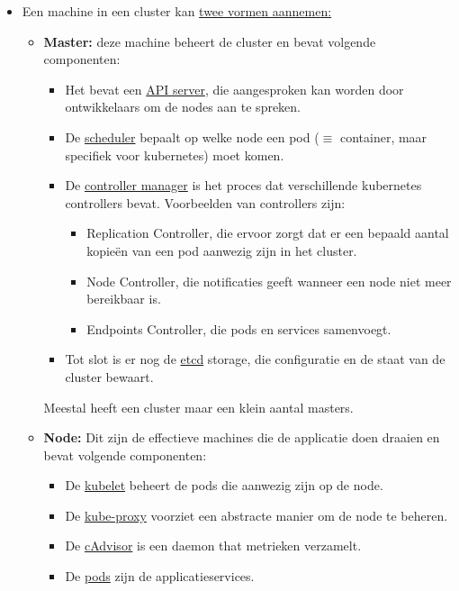 	\begin{itemize}
		\item[\info] Een machine in een cluster kan \underline{twee vormen aannemen:}
		\begin{itemize}
			\item[\info] \textbf{Master:} deze machine beheert de cluster en bevat volgende componenten:
			\begin{itemize}
				\item[\info]Het bevat een \underline{API server}, die aangesproken kan worden door ontwikkelaars om de nodes aan te spreken.
				\item[\info]De \underline{scheduler} bepaalt op welke node een pod ($\equiv$ container, maar specifiek voor kubernetes) moet komen.
				\item[\info]De \underline{controller manager} is het proces dat verschillende kubernetes controllers bevat. Voorbeelden van controllers zijn:
				\begin{itemize}
					\item[\info]Replication Controller, die ervoor zorgt dat er een bepaald aantal kopieën van een pod aanwezig zijn in het cluster.
					\item[\info]Node Controller, die notificaties geeft wanneer een node niet meer bereikbaar is.
					\item[\info]Endpoints Controller, die pods en services samenvoegt.
				\end{itemize}
				\item[\info]Tot slot is er nog de \underline{etcd} storage, die configuratie en de staat van de cluster bewaart.
			\end{itemize}

			Meestal heeft een cluster maar een klein aantal masters.
			\item[\info] \textbf{Node:} Dit zijn de effectieve machines die de applicatie doen draaien en bevat volgende componenten:
			\begin{itemize}
				\item[\info]De \underline{kubelet} beheert de pods die aanwezig zijn op de node.
				\item[\info]De \underline{kube-proxy} voorziet een abstracte manier om de node te beheren.
				\item[\info]De \underline{cAdvisor} is een daemon that metrieken verzamelt.
				\item[\info]De \underline{pods} zijn de applicatieservices. 
			\end{itemize}
		\end{itemize}


\end{itemize}
